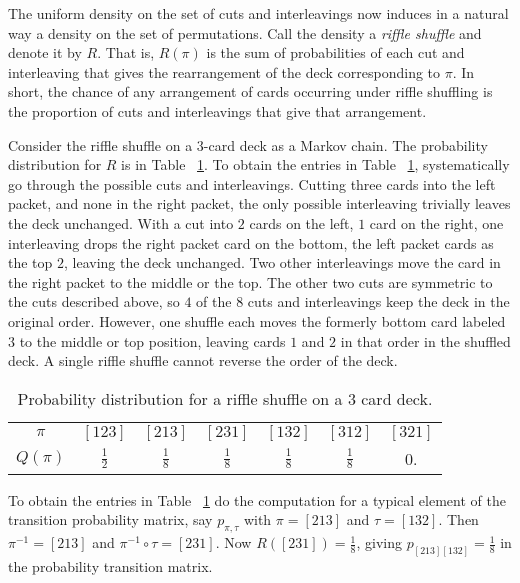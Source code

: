 \documentclass[12pt]{article}
\begin{document}
The uniform density on the set of cuts and interleavings now induces in
a natural way a density on the set of permutations.  Call the density a
\emph{riffle shuffle} and denote it by \( R \).  That is, \( R(\pi) \)
is the sum of probabilities of each cut and interleaving that gives the
rearrangement of the deck corresponding to \( \pi \).  In short, the
chance of any arrangement of cards occurring under riffle shuffling is
the proportion of cuts and interleavings that give that arrangement.

\begin{example}
    Consider the riffle shuffle on a \( 3 \)-card deck as a Markov
    chain.  The probability distribution for \( R \) is in Table~%
    \ref{tab:cardshuffling:riffle3}.  To obtain the entries in Table~%
    \ref{tab:cardshuffling:riffle3}, systematically go through the
    possible cuts and interleavings. Cutting three cards into the left
    packet, and none in the right packet, the only possible interleaving
    trivially leaves the deck unchanged.  With a cut into \( 2 \) cards
    on the left, \( 1 \) card on the right, one interleaving drops the
    right packet card on the bottom, the left packet cards as the top \(
    2 \), leaving the deck unchanged.  Two other interleavings move the
    card in the right packet to the middle or the top.  The other two
    cuts are symmetric to the cuts described above, so \( 4 \) of the \(
    8 \) cuts and interleavings keep the deck in the original order.
    However, one shuffle each moves the formerly bottom card labeled \(
    3 \) to the middle or top position, leaving cards \( 1 \) and \( 2 \)
    in that order in the shuffled deck.  A single riffle shuffle cannot
    reverse the order of the deck.

    \begin{table}
        \centering
        \caption{Probability distribution for a riffle shuffle
          on a $ 3 $ card deck.}
        \begin{tabular}{ccccccc}
            $\pi$    & $[123]$       & $[213]$       & $[231]$       & $[132]$       & $[312]$       & $[321]$ \\ 
            $Q(\pi)$ & $\frac{1}{2}$ & $\frac{1}{8}$ & $\frac{1}{8}$ & $\frac{1}{8}$ & $\frac{1}{8}$ & 0.      \\ 
        \end{tabular}%
        \label{tab:cardshuffling:riffle3}
    \end{table}

    To obtain the entries in Table~%
    \ref{tab:cardshuffling:riffle3} do the computation for a typical
    element of the transition probability matrix, say \( p_{\pi,\tau} \)
    with \( \pi = [213] \) and \( \tau = [132] \).  Then \( \pi^{-1} = [213]
    \) and \( \pi^{-1} \circ \tau = [231] \).  Now \( R([231]) = \frac{1}
    {8} \), giving \( p_{[213] [132]} = \frac{1}{8} \) in the
    probability transition matrix.


\end{example}
\end{document}

